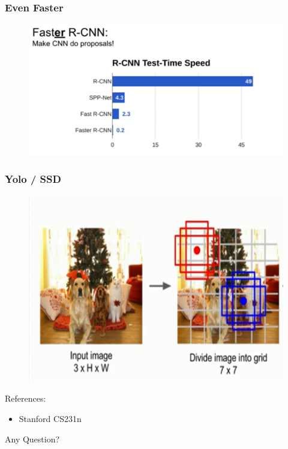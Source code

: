 \documentclass{beamer}
\begin{document}
\begin{frame}
\frametitle{Even Faster}

\begin{figure}
	\includegraphics[width=\linewidth]{Pics/fastercompare.png}
	
\end{figure}

\end{frame}

\begin{frame}
	\frametitle{Yolo / SSD}
	\begin{figure}
		\includegraphics[width= .8\linewidth]{Pics/yolo.PNG}
	\end{figure}
\end{frame}

\begin{frame}
	References:
	\begin{itemize}
		\item Stanford CS231n
	\end{itemize}
\end{frame}

\begin{frame}
\Huge
\centering
Any Question?
\end{frame}
\end{document}
